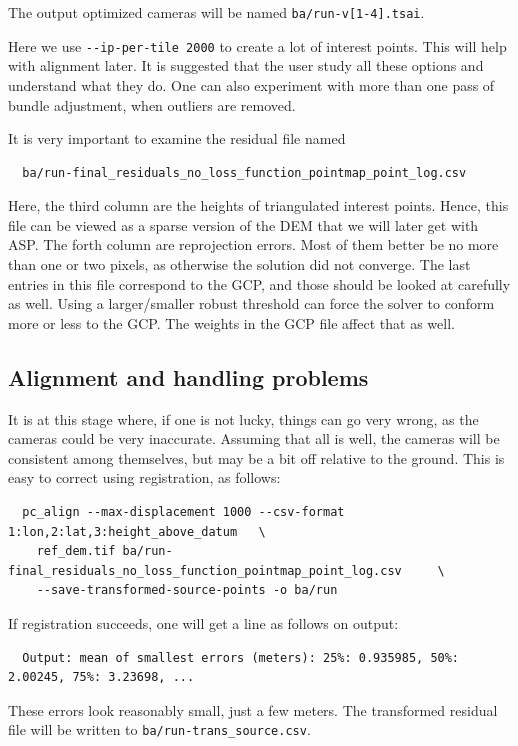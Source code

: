 The output optimized cameras will be named \texttt{ba/run-v[1-4].tsai}.

Here we use \texttt{-\/-ip-per-tile 2000} to create a lot of interest
points. This will help with alignment later. It is suggested that the
user study all these options and understand what they do. 
One can also experiment with more than one pass of bundle adjustment,
when outliers are removed. 

It is very important to examine the residual file named
\begin{verbatim}
  ba/run-final_residuals_no_loss_function_pointmap_point_log.csv
\end{verbatim}
Here, the third column are the heights of triangulated interest
points. Hence, this file can be viewed as a sparse version of the DEM
that we will later get with ASP. The forth column are reprojection
errors. Most of them better be no more than one or two pixels, as
otherwise the solution did not converge. The last entries in this
file correspond to the GCP, and those should be looked at carefully as well.
Using a larger/smaller robust threshold can force the solver to 
conform more or less to the GCP. The weights in the GCP file affect that as well.

\subsection{Alignment and handling problems}

It is at this stage where, if one is not lucky, things can go very
wrong, as the cameras could be very inaccurate. Assuming that all is
well, the cameras will be consistent among themselves, but may be a bit
off relative to the ground. This is easy to correct using registration,
as follows:
\begin{verbatim}
  pc_align --max-displacement 1000 --csv-format 1:lon,2:lat,3:height_above_datum   \
    ref_dem.tif ba/run-final_residuals_no_loss_function_pointmap_point_log.csv     \
    --save-transformed-source-points -o ba/run
\end{verbatim}

If registration succeeds, one will get a line as follows on output:
\begin{verbatim}
  Output: mean of smallest errors (meters): 25%: 0.935985, 50%: 2.00245, 75%: 3.23698, ...
\end{verbatim}

These errors look reasonably small, just a few meters. The transformed
residual file will be written to \texttt{ba/run-trans\_source.csv}.

